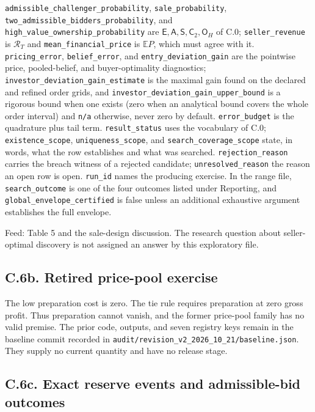 \documentclass[
  11pt,
]{article}
\begin{document}
\texttt{admissible\_challenger\_probability},
\texttt{sale\_probability},
\texttt{two\_admissible\_bidders\_probability}, and
\texttt{high\_value\_ownership\_probability} are
\(\mathsf E,\mathsf A,\mathsf S,\mathsf C_2,\mathsf O_H\) of C.0;
\texttt{seller\_revenue} is \(\mathcal R_T\) and
\texttt{mean\_financial\_price} is \(\mathbb E P\), which must agree
with it. \texttt{pricing\_error}, \texttt{belief\_error}, and
\texttt{entry\_deviation\_gain} are the pointwise price, pooled-belief,
and buyer-optimality diagnostics;
\texttt{investor\_deviation\_gain\_estimate} is the maximal gain found
on the declared and refined order grids, and
\texttt{investor\_deviation\_gain\_upper\_bound} is a rigorous bound
when one exists (zero when an analytical bound covers the whole order
interval) and \texttt{n/a} otherwise, never zero by default.
\texttt{error\_budget} is the quadrature plus tail term.
\texttt{result\_status} uses the vocabulary of C.0;
\texttt{existence\_scope}, \texttt{uniqueness\_scope}, and
\texttt{search\_coverage\_scope} state, in words, what the row
establishes and what was searched. \texttt{rejection\_reason} carries
the breach witness of a rejected candidate; \texttt{unresolved\_reason}
the reason an open row is open. \texttt{run\_id} names the producing
exercise. In the range file, \texttt{search\_outcome} is one of the four
outcomes listed under Reporting, and
\texttt{global\_envelope\_certified} is false unless an additional
exhaustive argument establishes the full envelope.

Feed: Table 5 and the sale-design discussion. The research question
about seller-optimal discovery is not assigned an answer by this
exploratory file.

\subsection{C.6b. Retired price-pool exercise}\label{oa-c-price-pools}

The low preparation cost is zero. The tie rule requires preparation at
zero gross profit. Thus preparation cannot vanish, and the former
price-pool family has no valid premise. The prior code, outputs, and
seven registry keys remain in the baseline commit recorded in
\texttt{audit/revision\_v2\_2026\_10\_21/baseline.json}. They supply no
current quantity and have no release stage.

\subsection{C.6c. Exact reserve events and admissible-bid
outcomes}\label{oa-c-reserve-events}
\end{document}

